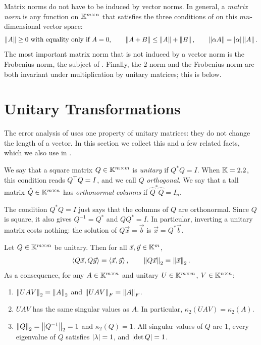 Matrix norms do not have to be induced by vector norms. In general, a \emph{matrix norm} is any function on $\mathbb{K}^{m \times n}$ that satisfies the three conditions of  on this $mn$-dimensional vector space:
\begin{equation}
  \left\lVert A \right\rVert \ge 0 \text{ with equality only if } A = 0, \qquad \left\lVert A + B \right\rVert \le \left\lVert A \right\rVert + \left\lVert B \right\rVert, \qquad \left\lVert \alpha A \right\rVert = \left\lvert \alpha \right\rvert\left\lVert A \right\rVert.
\end{equation}
The most important matrix norm that is not induced by a vector norm is the Frobenius norm, the subject of . Finally, the $2$-norm and the Frobenius norm are both invariant under multiplication by unitary matrices; this is  below.

\section{Unitary Transformations}
\label{sec:unitary}

The error analysis of  uses one property of unitary matrices: they do not change the length of a vector. In this section we collect this and a few related facts, which we also use in .

\begin{definition}
  We say that a square matrix $Q \in \mathbb{K}^{m \times m}$ is \emph{unitary} if $Q^\ast Q = I$. When $\mathbb{K} = 2.2$, this condition reads $Q^\top Q = I$, and we call $Q$ \emph{orthogonal}. We say that a tall matrix $\hat{Q} \in \mathbb{K}^{m \times n}$ has \emph{orthonormal columns} if $\hat{Q}^\ast\hat{Q} = I_n$.
\end{definition}

The condition $Q^\ast Q = I$ just says that the columns of $Q$ are orthonormal. Since $Q$ is square, it also gives $Q^{-1} = Q^\ast$ and $QQ^\ast = I$. In particular, inverting a unitary matrix costs nothing: the solution of $Q\vec{x} = \vec{b}$ is $\vec{x} = Q^\ast\vec{b}$.

\begin{theorem}
  \label{thm:unitary}
  Let $Q \in \mathbb{K}^{m \times m}$ be unitary. Then for all $\vec{x}, \vec{y} \in \mathbb{K}^m$,
  \begin{equation}
    \left\langle Q\vec{x}, Q\vec{y} \right\rangle = \left\langle \vec{x}, \vec{y} \right\rangle, \qquad \left\lVert Q\vec{x} \right\rVert_2 = \left\lVert \vec{x} \right\rVert_2.
  \end{equation}
  As a consequence, for any $A \in \mathbb{K}^{m \times n}$ and unitary $U \in \mathbb{K}^{m \times m}$, $V \in \mathbb{K}^{n \times n}$:
  \begin{enumerate}
    \item $\left\lVert UAV \right\rVert_2 = \left\lVert A \right\rVert_2$ and $\left\lVert UAV \right\rVert_F = \left\lVert A \right\rVert_F$.
    \item $UAV$ has the same singular values as $A$. In particular, $\kappa_2(UAV) = \kappa_2(A)$.
    \item $\left\lVert Q \right\rVert_2 = \left\lVert Q^{-1} \right\rVert_2 = 1$ and $\kappa_2(Q) = 1$. All singular values of $Q$ are $1$, every eigenvalue of $Q$ satisfies $\left\lvert \lambda \right\rvert = 1$, and $\left\lvert \det Q \right\rvert = 1$.
  \end{enumerate}
\end{theorem}


